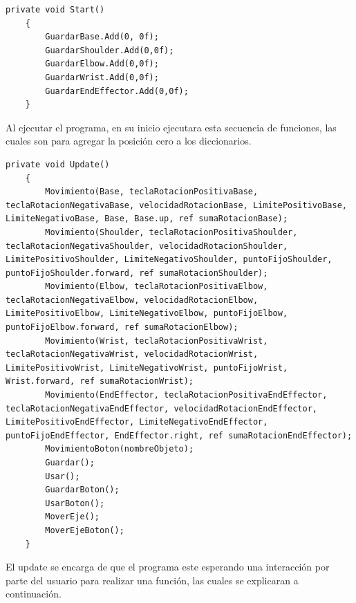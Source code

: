 \clearpage
\begin{lstlisting}[frame=single]
    private void Start()
    {
        GuardarBase.Add(0, 0f);
        GuardarShoulder.Add(0,0f);
        GuardarElbow.Add(0,0f);
        GuardarWrist.Add(0,0f);
        GuardarEndEffector.Add(0,0f);
    }
\end{lstlisting}
Al ejecutar el programa, en su inicio ejecutara esta secuencia de funciones, las cuales son para agregar la posición cero a los diccionarios.

\begin{lstlisting}[frame=single]
    private void Update()
    {
        Movimiento(Base, teclaRotacionPositivaBase, teclaRotacionNegativaBase, velocidadRotacionBase, LimitePositivoBase, LimiteNegativoBase, Base, Base.up, ref sumaRotacionBase);
        Movimiento(Shoulder, teclaRotacionPositivaShoulder, teclaRotacionNegativaShoulder, velocidadRotacionShoulder, LimitePositivoShoulder, LimiteNegativoShoulder, puntoFijoShoulder, puntoFijoShoulder.forward, ref sumaRotacionShoulder);
        Movimiento(Elbow, teclaRotacionPositivaElbow, teclaRotacionNegativaElbow, velocidadRotacionElbow, LimitePositivoElbow, LimiteNegativoElbow, puntoFijoElbow, puntoFijoElbow.forward, ref sumaRotacionElbow);
        Movimiento(Wrist, teclaRotacionPositivaWrist, teclaRotacionNegativaWrist, velocidadRotacionWrist, LimitePositivoWrist, LimiteNegativoWrist, puntoFijoWrist, Wrist.forward, ref sumaRotacionWrist);
        Movimiento(EndEffector, teclaRotacionPositivaEndEffector, teclaRotacionNegativaEndEffector, velocidadRotacionEndEffector, LimitePositivoEndEffector, LimiteNegativoEndEffector, puntoFijoEndEffector, EndEffector.right, ref sumaRotacionEndEffector);
        MovimientoBoton(nombreObjeto);
        Guardar();
        Usar();
        GuardarBoton();
        UsarBoton();
        MoverEje();
        MoverEjeBoton();
    }
\end{lstlisting}
El update se encarga de que el programa este esperando una interacción por parte del usuario para realizar una función, las cuales se explicaran a continuación.
\clearpage
